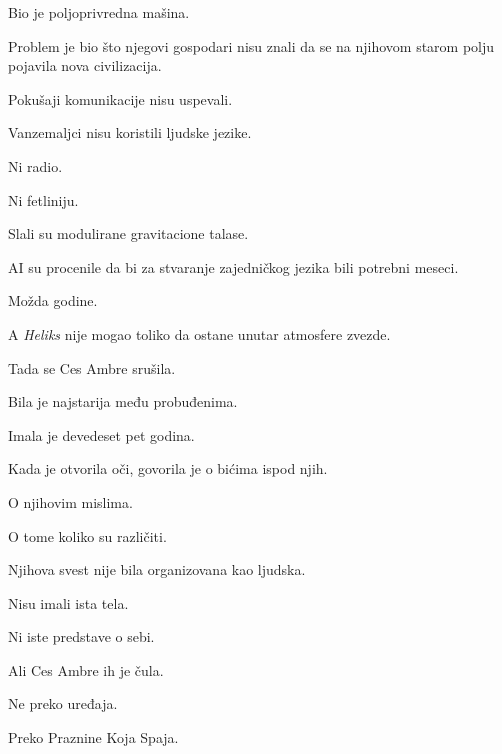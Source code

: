 Bio je poljoprivredna mašina.

\bigskip

Problem je bio što njegovi gospodari nisu znali da se na njihovom starom polju pojavila nova civilizacija.

\bigskip

Pokušaji komunikacije nisu uspevali.

\bigskip

Vanzemaljci nisu koristili ljudske jezike.

Ni radio.

Ni fetliniju.

\bigskip

Slali su modulirane gravitacione talase.

\bigskip

AI su procenile da bi za stvaranje zajedničkog jezika bili potrebni meseci.

Možda godine.

\bigskip

A \emph{Heliks} nije mogao toliko da ostane unutar atmosfere zvezde.

\bigskip

Tada se Ces Ambre srušila.

\bigskip

Bila je najstarija među probuđenima.

\bigskip

Imala je devedeset pet godina.

\bigskip

Kada je otvorila oči, govorila je o bićima ispod njih.

\bigskip

O njihovim mislima.

\bigskip

O tome koliko su različiti.

\bigskip

Njihova svest nije bila organizovana kao ljudska.

\bigskip

Nisu imali ista tela.

Ni iste predstave o sebi.

\bigskip

Ali Ces Ambre ih je čula.

\bigskip

Ne preko uređaja.

\bigskip

Preko Praznine Koja Spaja.

\bigskip

